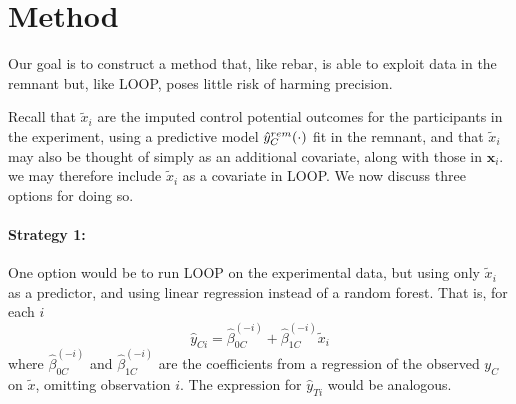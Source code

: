 \section{Method}
Our goal is to construct a method that, like rebar, is able to exploit data in the remnant but, like LOOP, poses little risk of harming precision.

Recall that
$\tilde{x}_{i}$ are the imputed control potential outcomes for the
participants in the experiment, using a predictive model
$\hat{y}_C^{rem}(\cdot)$ fit in the remnant, and that
$\tilde{x}_{i}$ may also be thought of simply as an additional
covariate, along with those in $\mathbf{x}_i$.
we may therefore include $\tilde{x}_{i}$ as a covariate in LOOP.  We now discuss
three options for doing so.



\paragraph{Strategy 1:}
One option would be to run LOOP on the experimental data, but using only $\tilde{x}_{i}$ as a predictor, and using linear regression instead of a random forest.  That is, for each $i$
\begin{equation}
\hat{y}_{Ci} = \hat{\beta}_{0C}^{(-i)} + \hat{\beta}_{1C}^{(-i)}\tilde{x}_{i}
\end{equation}
where  $\hat{\beta}_{0C}^{(-i)}$ and $\hat{\beta}_{1C}^{(-i)}$ are the
coefficients from a regression of the observed $y_C$ on $\tilde{x}$,
omitting observation $i$.  The expression for $\hat{y}_{Ti}$ would be
analogous.


